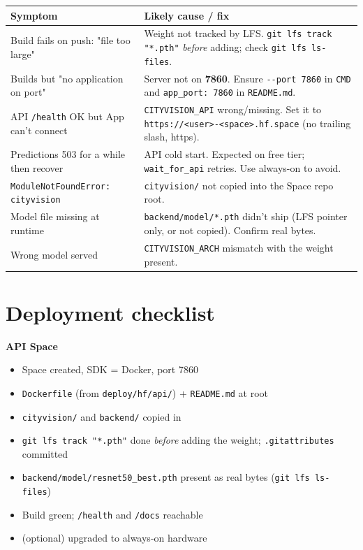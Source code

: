 \documentclass[11pt]{article}
\newcommand{\code}[1]{\lstinline[basicstyle=\ttfamily\normalsize]|#1|}
\begin{document}
\begin{tabularx}{\linewidth}{@{}XX@{}}
\toprule
\textbf{Symptom} & \textbf{Likely cause / fix} \\
\midrule
Build fails on push: "file too large" & Weight not tracked by LFS.
\code{git lfs track "*.pth"} \emph{before} adding; check \code{git lfs ls-files}. \\
\addlinespace
Builds but "no application on port" & Server not on \textbf{7860}. Ensure
\code{--port 7860} in \code{CMD} and \code{app_port: 7860} in \code{README.md}. \\
\addlinespace
API \code{/health} OK but App can't connect & \code{CITYVISION_API} wrong/missing.
Set it to \code{https://<user>-<space>.hf.space} (no trailing slash, https). \\
\addlinespace
Predictions 503 for a while then recover & API cold start. Expected on free tier;
\code{wait_for_api} retries. Use always-on to avoid. \\
\addlinespace
\code{ModuleNotFoundError: cityvision} & \code{cityvision/} not copied into the Space
repo root. \\
\addlinespace
Model file missing at runtime & \code{backend/model/*.pth} didn't ship (LFS pointer
only, or not copied). Confirm real bytes. \\
\addlinespace
Wrong model served & \code{CITYVISION_ARCH} mismatch with the weight present. \\
\bottomrule
\end{tabularx}

\section{Deployment checklist}

\noindent\textbf{API Space}
\begin{itemize}[label=$\square$]
  \item Space created, SDK = Docker, port 7860
  \item \code{Dockerfile} (from \code{deploy/hf/api/}) + \code{README.md} at root
  \item \code{cityvision/} and \code{backend/} copied in
  \item \code{git lfs track "*.pth"} done \emph{before} adding the weight;
    \code{.gitattributes} committed
  \item \code{backend/model/resnet50_best.pth} present as real bytes
    (\code{git lfs ls-files})
  \item Build green; \code{/health} and \code{/docs} reachable
  \item (optional) upgraded to always-on hardware
\end{itemize}
\end{document}
